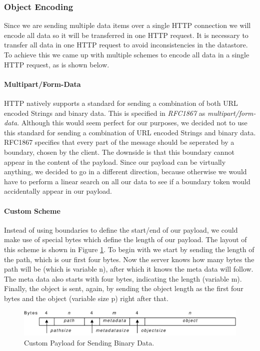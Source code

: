 \subsubsection{Object Encoding} 
\label{serverdesign-encoding}
Since we are sending multiple data items over a single HTTP connection we will
encode all data so it will be transferred in one HTTP request. It is necessary
to transfer all data in one HTTP request to avoid inconsistencies in the
datastore. To achieve this we came up with multiple schemes to encode all data
in a single HTTP request, as is shown below.

\paragraph{Multipart/Form-Data}
HTTP natively supports a standard for sending a combination of both URL encoded
Strings and binary data. This is specified in \emph{RFC1867} as
\emph{multipart/form-data}. Although this would seem perfect for our purposes, we
decided not to use this standard for sending a combination of URL encoded Strings
and binary data. RFC1867 specifies that every part of the message should be
seperated by a boundary, chosen by the client. The downside is that this boundary
cannot appear in the content of the payload. Since our payload can be virtually
anything, we decided to go in a different direction, because otherwise we would
have to perform a linear search on all our data to see if a boundary token would
accidentally appear in our payload.

\paragraph{Custom Scheme}
Instead of using boundaries to define the start/end of our payload, we could make
use of special bytes which define the length of our payload. The layout of this
scheme is shown in Figure \ref{serverdesign-custom}. To begin with we start by
sending the length of the path, which is our first four bytes. Now the server
knows how many bytes the path will be (which is variable n), after which it knows
the meta data will follow. The meta data also starts with four bytes, indicating
the length (variable m). Finally, the object is sent, again, by sending the
object length as the first four bytes and the object (variable size p) right
after that.

\begin{figure}[ht] %
\begin{center}
\includegraphics[width=12cm]{./figures/custom_payload.pdf} 
\caption{Custom Payload for Sending Binary Data.\label{serverdesign-custom}}
\end{center}
\end{figure}

